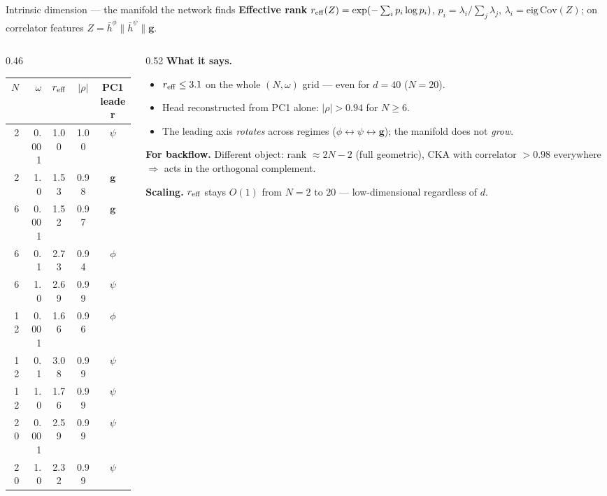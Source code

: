 \documentclass[10pt,aspectratio=169]{beamer}
\begin{document}
\begin{frame}{Intrinsic dimension --- the manifold the network finds}
\small
\textbf{Effective rank} $r_{\rm eff}(Z)=\exp(-\sum_i p_i\log p_i)$, $p_i=\lambda_i/\sum_j\lambda_j$,
$\lambda_i=\mathrm{eig}\,\mathrm{Cov}(Z)$; on correlator features $Z=\bar h^\phi\|\bar h^\psi\|\mathbf g$.

\begin{columns}[T,onlytextwidth]
\begin{column}{0.46\textwidth}
\scriptsize
\begin{tabular}{rrccc}
\toprule
$N$ & $\omega$ & $r_{\rm eff}$ & $|\rho|$ & PC1 leader \\
\midrule
2 & 0.001 & 1.00 & 1.00 & $\psi$ \\
2 & 1.0   & 1.53 & 0.98 & $\mathbf g$ \\
\midrule
6 & 0.001 & 1.52 & 0.97 & $\mathbf g$ \\
6 & 0.1   & 2.73 & 0.94 & $\phi$ \\
6 & 1.0   & 2.69 & 0.99 & $\psi$ \\
\midrule
12 & 0.001 & 1.66 & 0.96 & $\phi$ \\
12 & 0.1   & 3.08 & 0.99 & $\psi$ \\
12 & 1.0   & 1.76 & 0.99 & $\psi$ \\
\midrule
20 & 0.001 & 2.59 & 0.99 & $\psi$ \\
20 & 1.0   & 2.32 & 0.99 & $\psi$ \\
\bottomrule
\end{tabular}
\end{column}
\begin{column}{0.52\textwidth}
\small
\textbf{What it says.}
\begin{itemize}\setlength\itemsep{0pt}\small
\item $r_{\rm eff}\le 3.1$ on the whole $(N,\omega)$ grid --- even for $d{=}40$ ($N{=}20$).
\item Head reconstructed from PC1 alone: $|\rho|>0.94$ for $N\ge 6$.
\item The leading axis \emph{rotates} across regimes ($\phi\leftrightarrow\psi\leftrightarrow\mathbf g$); the
manifold does not \emph{grow}.
\end{itemize}

\vspace{2pt}
\textbf{For backflow.} Different object: rank $\approx 2N-2$ (full geometric), CKA with correlator
$>0.98$ everywhere $\Rightarrow$ acts in the orthogonal complement.

\vspace{2pt}
\textbf{Scaling.} $r_{\rm eff}$ stays $O(1)$ from $N{=}2$ to $20$ --- low-dimensional regardless of $d$.
\end{column}
\end{columns}
\end{frame}
\end{document}
